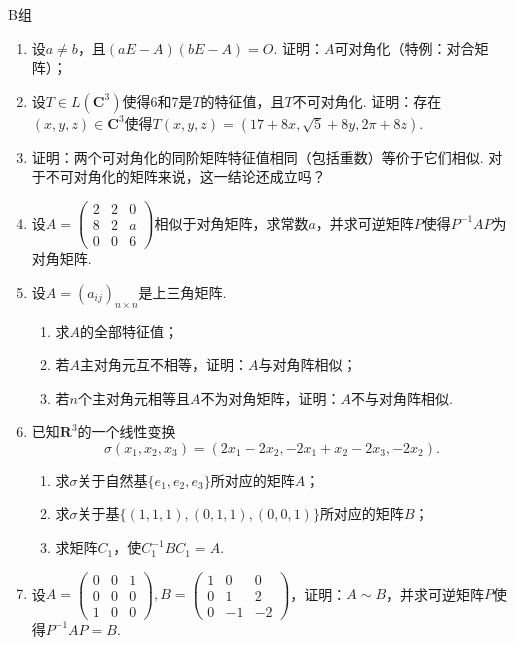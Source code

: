 \centerline{\heiti B组}
\begin{enumerate}
    \item 设$a\neq b$，且$(aE-A)(bE-A)=O$. 证明：$A$可对角化（特例：对合矩阵）；

    \item 设$T\in L(\mathbf{C}^3)$使得6和7是$T$的特征值，且$T$不可对角化. 证明：存在$(x,y,z)\in\mathbf{C}^3$使得$T(x,y,z)=(17+8x,\sqrt{5}+8y,2\pi+8z)$.

    \item 证明：两个可对角化的同阶矩阵特征值相同（包括重数）等价于它们相似. 对于不可对角化的矩阵来说，这一结论还成立吗？

    \item 设$A=\begin{pmatrix}
                  2 & 2 & 0 \\ 8 & 2 & a \\ 0 & 0 & 6
              \end{pmatrix}$相似于对角矩阵，求常数$a$，并求可逆矩阵$P$使得$P^{-1}AP$为对角矩阵.

    \item 设$A=(a_{ij})_{n\times n}$是上三角矩阵.
          \begin{enumerate}
              \item 求$A$的全部特征值；

              \item 若$A$主对角元互不相等，证明：$A$与对角阵相似；

              \item 若$n$个主对角元相等且$A$不为对角矩阵，证明：$A$不与对角阵相似.
          \end{enumerate}

    \item 已知$\mathbf{R}^3$的一个线性变换
          \[\sigma(x_1,x_2,x_3)=(2x_1-2x_2,-2x_1+x_2-2x_3,-2x_2).\]
          \begin{enumerate}
              \item 求$\sigma$关于自然基$\{e_1,e_2,e_3\}$所对应的矩阵$A$；

              \item 求$\sigma$关于基$\{(1,1,1),(0,1,1),(0,0,1)\}$所对应的矩阵$B$；

              \item 求矩阵$C_1$，使$C_1^{-1}BC_1=A$.
          \end{enumerate}

    \item 设$A=\begin{pmatrix}
                  0 & 0 & 1 \\ 0 & 0 & 0 \\ 1 & 0 & 0
              \end{pmatrix},B=\begin{pmatrix}
                  1 & 0 & 0 \\ 0 & 1 & 2 \\ 0 & -1 & -2
              \end{pmatrix}$，证明：$A\sim B$，并求可逆矩阵$P$使得$P^{-1}AP=B$.


\end{enumerate}
